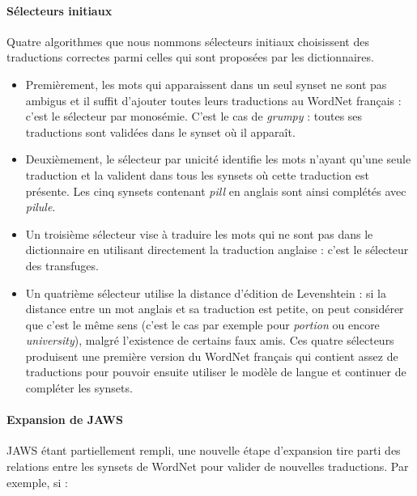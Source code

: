 \paragraph{Sélecteurs initiaux} Quatre algorithmes que nous nommons sélecteurs
initiaux choisissent des traductions correctes parmi celles qui sont proposées
par les dictionnaires.

\begin{itemize}

    \item Premièrement, les mots qui apparaissent dans un seul synset ne sont
        pas ambigus et il suffit d'ajouter toutes leurs traductions au WordNet
        français : c'est le sélecteur par monosémie. C'est le cas de
        \textit{grumpy} : toutes ses traductions sont validées dans le synset
        où il apparaît.

    \item Deuxièmement, le sélecteur par unicité identifie les mots n'ayant
        qu'une seule traduction et la valident dans tous les synsets où cette
        traduction est présente. Les cinq synsets contenant \textit{pill} en
        anglais sont ainsi complétés avec \textit{pilule}.

    \item Un troisième sélecteur vise à traduire les mots qui ne sont pas dans
        le dictionnaire en utilisant directement la traduction anglaise : c'est
        le sélecteur des transfuges.

    \item Un quatrième sélecteur utilise la distance d'édition de Levenshtein :
        si la distance entre un mot anglais et sa traduction est petite, on
        peut considérer que c'est le même sens (c'est le cas par exemple pour
        \textit{portion} ou encore \textit{university}), malgré l'existence de
        certains faux amis. Ces quatre sélecteurs produisent une première
        version du WordNet français qui contient assez de traductions pour
        pouvoir ensuite utiliser le modèle de langue et continuer de compléter
        les synsets.

\end{itemize}

\paragraph{Expansion de JAWS} JAWS étant partiellement rempli, une nouvelle étape d'expansion tire parti des relations entre les synsets de WordNet pour valider de nouvelles traductions. Par exemple, si :

